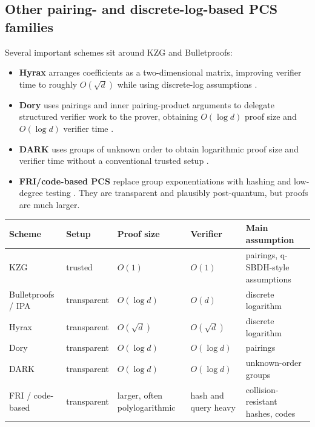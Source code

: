 \subsection{Other pairing- and discrete-log-based PCS families}

Several important schemes sit around KZG and Bulletproofs:
\begin{itemize}[leftmargin=2em]
    \item \textbf{Hyrax} arranges coefficients as a two-dimensional matrix, improving verifier time to roughly $O(\sqrt d)$ while using discrete-log assumptions \cite{WahbyTziallaShelatThalerWalfish2018}.
    \item \textbf{Dory} uses pairings and inner pairing-product arguments to delegate structured verifier work to the prover, obtaining $O(\log d)$ proof size and $O(\log d)$ verifier time \cite{Lee2021Dory}.
    \item \textbf{DARK} uses groups of unknown order to obtain logarithmic proof size and verifier time without a conventional trusted setup \cite{BunzFischSzepieniec2020DARK}.
    \item \textbf{FRI/code-based PCS} replace group exponentiations with hashing and low-degree testing \cite{BenSassonBentovHoreshRiabzev2018FRI}. They are transparent and plausibly post-quantum, but proofs are much larger.
\end{itemize}

\begin{center}
\begin{tabular}{>{\raggedright\arraybackslash}p{2.5cm} >{\raggedright\arraybackslash}p{2.4cm} >{\raggedright\arraybackslash}p{2.4cm} >{\raggedright\arraybackslash}p{2.4cm} >{\raggedright\arraybackslash}p{3.0cm}}
\toprule
Scheme & Setup & Proof size & Verifier & Main assumption \\
\midrule
KZG & trusted & $O(1)$ & $O(1)$ & pairings, q-SBDH-style assumptions \\
Bulletproofs / IPA & transparent & $O(\log d)$ & $O(d)$ & discrete logarithm \\
Hyrax \cite{WahbyTziallaShelatThalerWalfish2018} & transparent & $O(\sqrt d)$ & $O(\sqrt d)$ & discrete logarithm \\
Dory \cite{Lee2021Dory} & transparent & $O(\log d)$ & $O(\log d)$ & pairings \\
DARK \cite{BunzFischSzepieniec2020DARK} & transparent & $O(\log d)$ & $O(\log d)$ & unknown-order groups \\
FRI / code-based & transparent & larger, often polylogarithmic & hash and query heavy & collision-resistant hashes, codes \\
\bottomrule
\end{tabular}
\end{center}

